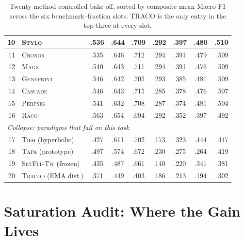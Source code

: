 ﻿\documentclass[11pt]{article}
\newcommand{\method}{\textsc{TRACO}\xspace}
\begin{document}
\begin{table}[t]
\begin{tabular}{r l ccc ccc r}
10 & \textsc{Stylo}              & .536          & .644          & .709          & .292          & .397          & .480          & .510 \\
\midrule
11 & \textsc{Cronos}             & .535          & .646          & .712          & .294          & .391          & .479          & .509 \\
12 & \textsc{Mage}               & .540          & .643          & .711          & .294          & .391          & .476          & .509 \\
13 & \textsc{Geneprint}          & .546          & .642          & .705          & .293          & .385          & .481          & .509 \\
14 & \textsc{Cascade}            & .546          & .643          & .715          & .285          & .378          & .476          & .507 \\
15 & \textsc{Perpsig}            & .541          & .632          & .708          & .287          & .374          & .481          & .504 \\
16 & \textsc{Raco}               & .563          & .654          & .694          & .292          & .352          & .397          & .492 \\
\midrule
\multicolumn{9}{l}{\emph{Collapse: paradigms that fail on this task}} \\
17 & \textsc{Tieh} (hyperbolic)  & .427 & .611 & .702 & .173 & .323 & .444 & .447 \\
18 & \textsc{Tapa} (prototype)   & .497 & .574 & .672 & .230 & .275 & .264 & .419 \\
19 & \textsc{SetFit-Tw} (frozen) & .435 & .487 & .661 & .140 & .220 & .341 & .381 \\
20 & \textsc{Tracod} (EMA dist.) & .371 & .449 & .403 & .186 & .213 & .194 & .302 \\
\bottomrule
\end{tabular}
\caption{\label{tab:bakeoff}
Twenty-method controlled bake-off, sorted by composite mean
Macro-F1 across the six benchmark--fraction slots. \method is the
only entry in the top three at every slot.}
\end{table}

\section{Saturation Audit: Where the Gain Lives}
\label{app:saturation}
\end{document}
